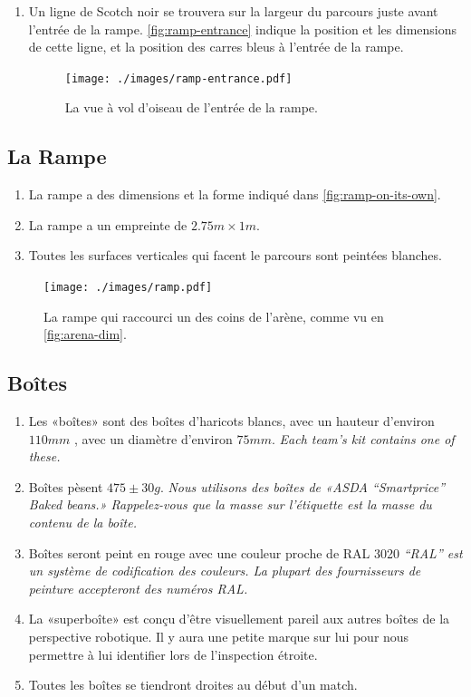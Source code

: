 \begin{enumerate}
\item Un ligne de Scotch noir se trouvera sur la largeur du parcours juste avant l'entrée de la rampe.  \autoref{fig:ramp-entrance} indique la position et les dimensions de cette ligne, et la position des carres bleus à l'entrée de la rampe.

  \begin{figure}
    \begin{center}
    \texttt{[image: ./images/ramp-entrance.pdf]}
    \end{center}
    \caption{\label{fig:ramp-entrance}La vue à vol d'oiseau de l'entrée de la rampe.}
  \end{figure}


\end{enumerate}

\subsection{La Rampe}
\label{sub:Ramp}
\begin {enumerate}
\item La rampe a des dimensions et la forme indiqué dans \autoref{fig:ramp-on-its-own}.
\item La rampe a un empreinte de $2.75m \times 1m$.
\item Toutes les surfaces verticales qui facent le parcours sont peintées blanches.
\end {enumerate}

\begin{figure}
  \begin{center}
    \texttt{[image: ./images/ramp.pdf]}
  \end{center}
  \caption{\label{fig:ramp-on-its-own}La rampe qui raccourci un des coins de l'arène, comme vu en \autoref{fig:arena-dim}.}
\end{figure}

\subsection{Boîtes}
\label{sub:Tokens}
\begin {enumerate}
\item Les «boîtes» sont des boîtes d'haricots blancs, avec un hauteur d'environ $110mm$ , avec un diamètre d'environ $75mm$.
\emph{Each team's kit contains one of these.}
\item Boîtes pèsent $475\pm30g$.  \emph{Nous utilisons des boîtes de «ASDA ``Smartprice'' Baked beans.»  Rappelez-vous que la masse sur l'étiquette est la masse du contenu de la boîte.}
\item Boîtes seront peint en rouge avec une couleur proche de RAL 3020  \emph{``RAL'' est un système de codification des couleurs. La plupart des fournisseurs de peinture accepteront des numéros RAL.}

\item La «superboîte» est conçu d'être visuellement pareil aux autres boîtes de la perspective robotique. Il y aura une petite marque sur lui pour nous permettre à lui identifier lors de l'inspection étroite.
\item Toutes les boîtes se tiendront droites au début d'un match.
\end {enumerate}

